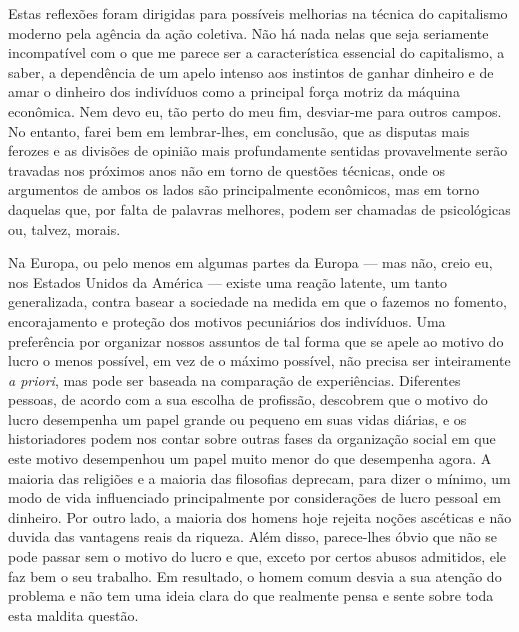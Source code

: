 \documentclass[12pt]{article}
\begin{document}
Estas reflexões foram dirigidas para possíveis melhorias na técnica do capitalismo moderno pela agência da ação coletiva. Não há nada nelas que seja seriamente incompatível com o que me parece ser a característica essencial do capitalismo, a saber, a dependência de um apelo intenso aos instintos de ganhar dinheiro e de amar o dinheiro dos indivíduos como a principal força motriz da máquina econômica. Nem devo eu, tão perto do meu fim, desviar-me para outros campos. No entanto, farei bem em lembrar-lhes, em conclusão, que as disputas mais ferozes e as divisões de opinião mais profundamente sentidas provavelmente serão travadas nos próximos anos não em torno de questões técnicas, onde os argumentos de ambos os lados são principalmente econômicos, mas em torno daquelas que, por falta de palavras melhores, podem ser chamadas de psicológicas ou, talvez, morais.

Na Europa, ou pelo menos em algumas partes da Europa — mas não, creio eu, nos Estados Unidos da América — existe uma reação latente, um tanto generalizada, contra basear a sociedade na medida em que o fazemos no fomento, encorajamento e proteção dos motivos pecuniários dos indivíduos. Uma preferência por organizar nossos assuntos de tal forma que se apele ao motivo do lucro o menos possível, em vez de o máximo possível, não precisa ser inteiramente \textit{a priori}, mas pode ser baseada na comparação de experiências. Diferentes pessoas, de acordo com a sua escolha de profissão, descobrem que o motivo do lucro desempenha um papel grande ou pequeno em suas vidas diárias, e os historiadores podem nos contar sobre outras fases da organização social em que este motivo desempenhou um papel muito menor do que desempenha agora. A maioria das religiões e a maioria das filosofias deprecam, para dizer o mínimo, um modo de vida influenciado principalmente por considerações de lucro pessoal em dinheiro. Por outro lado, a maioria dos homens hoje rejeita noções ascéticas e não duvida das vantagens reais da riqueza. Além disso, parece-lhes óbvio que não se pode passar sem o motivo do lucro e que, exceto por certos abusos admitidos, ele faz bem o seu trabalho. Em resultado, o homem comum desvia a sua atenção do problema e não tem uma ideia clara do que realmente pensa e sente sobre toda esta maldita questão.
\end{document}
